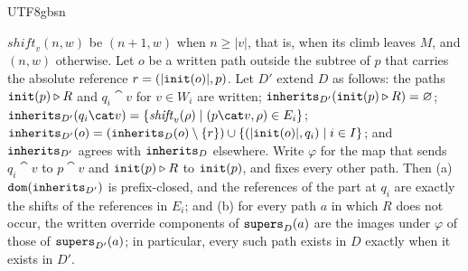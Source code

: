 \begin{CJK*}{UTF8}{gbsn}
\begin{theorem}
  $\mathit{shift}_v(n, w)$ be $(n + 1, w)$ when $n \ge |v|$, that is, when its climb leaves $M$, and
  $(n, w)$ otherwise. Let $o$ be a written path outside the subtree of $p$ that carries the absolute
  reference $r = (|\mathtt{init}(o)|, p)$. Let $D'$ extend $D$ as follows: the paths $\mathtt{init}(p) \mathbin{\triangleright} R$ and
  $q_i \cat v$ for $v \in W_i$ are written; $\mathtt{inherits}_{D'}(\mathtt{init}(p) \mathbin{\triangleright} R) = \varnothing$;
  $\inherits_{D'}(q_i \cat v) = \{\mathit{shift}_v(\rho) \mid (p \cat v, \rho) \in E_i\}$;
  $\mathtt{inherits}_{D'}(o) = (\mathtt{inherits}_D(o) \setminus \{r\}) \cup \{(|\mathtt{init}(o)|, q_i) \mid i \in I\}$;
  and $\mathtt{inherits}_{D'}$ agrees with $\mathtt{inherits}_D$ elsewhere. Write $\varphi$ for the map that sends
  $q_i \cat v$ to $p \cat v$ and $\mathtt{init}(p) \mathbin{\triangleright} R$ to $\mathtt{init}(p)$, and fixes every other path. Then
  (a) $\mathtt{dom}(\mathtt{inherits}_{D'})$ is prefix-closed, and the references of the part at $q_i$ are exactly the
  shifts of the references in $E_i$; and (b) for every path $a$ in which $R$ does not occur, the
  written override components of $\mathtt{supers}_D(a)$ are the images under $\varphi$ of those of
  $\mathtt{supers}_{D'}(a)$; in particular, every such path exists in $D$ exactly when it exists in $D'$.
  \fi
\end{theorem}


\end{CJK*}
